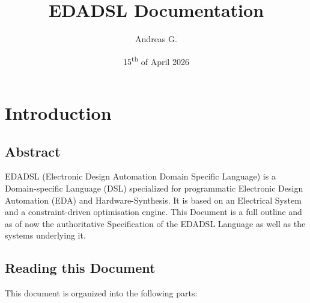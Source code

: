 \documentclass{report}
\title{EDADSL Documentation}
\author{Andreas G.}
\date{15\textsuperscript{th} of April 2026}
\begin{document}
\large
\maketitle
\clearpage
\tableofcontents
\clearpage
%
%
% 
% 
% 
% 
% 
% 
% 
% 
% 
\chapter{Introduction}
\section{Abstract}
EDADSL (Electronic Design Automation Domain Specific Language) is a Domain-specific Language (DSL) specialized for programmatic Electronic Design Automation (EDA) and Hardware-Synthesis. 
It is based on an Electrical System and a constraint-driven optimisation engine.
This Document is a full outline and as of now the authoritative Specification of the EDADSL Language as well as the systems underlying it.

\section{Reading this Document}
This document is organized into the following parts:
\end{document}
